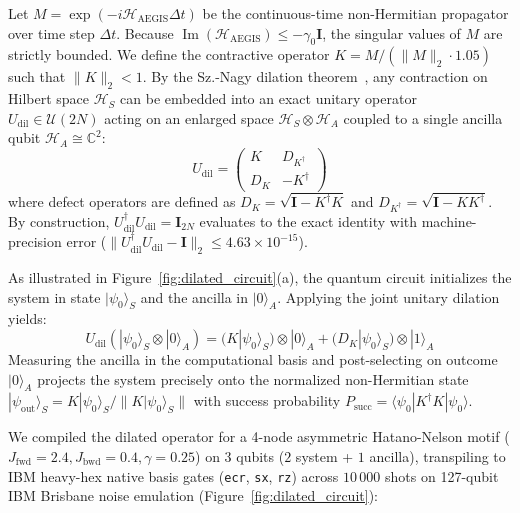 \documentclass[10pt,twocolumn,letterpaper]{article}
\begin{document}
Let $M = \exp(-i \mathcal{H}_{\text{AEGIS}} \Delta t)$ be the continuous-time non-Hermitian propagator over time step $\Delta t$. Because $\operatorname{Im}(\mathcal{H}_{\text{AEGIS}}) \le -\gamma_0 \mathbf{I}$, the singular values of $M$ are strictly bounded. We define the contractive operator $K = M / (\|M\|_2 \cdot 1.05)$ such that $\|K\|_2 < 1$. By the Sz.-Nagy dilation theorem~\cite{kawabata2019symmetry, ashida2020nonhermitian}, any contraction on Hilbert space $\mathcal{H}_S$ can be embedded into an exact unitary operator $U_{\text{dil}} \in \mathcal{U}(2N)$ acting on an enlarged space $\mathcal{H}_S \otimes \mathcal{H}_A$ coupled to a single ancilla qubit $\mathcal{H}_A \cong \mathbb{C}^2$:
\begin{equation}
U_{\text{dil}} = \begin{pmatrix} K & D_{K^\dagger} \\ D_K & -K^\dagger \end{pmatrix}
\end{equation}
where defect operators are defined as $D_K = \sqrt{\mathbf{I} - K^\dagger K}$ and $D_{K^\dagger} = \sqrt{\mathbf{I} - K K^\dagger}$. By construction, $U_{\text{dil}}^\dagger U_{\text{dil}} = \mathbf{I}_{2N}$ evaluates to the exact identity with machine-precision error ($\|U_{\text{dil}}^\dagger U_{\text{dil}} - \mathbf{I}\|_2 \le 4.63 \times 10^{-15}$).

As illustrated in Figure~\ref{fig:dilated_circuit}(a), the quantum circuit initializes the system in state $|\psi_0\rangle_S$ and the ancilla in $|0\rangle_A$. Applying the joint unitary dilation yields:
\begin{equation}
U_{\text{dil}} (|\psi_0\rangle_S \otimes |0\rangle_A) = (K |\psi_0\rangle_S) \otimes |0\rangle_A + (D_K |\psi_0\rangle_S) \otimes |1\rangle_A
\end{equation}
Measuring the ancilla in the computational basis and post-selecting on outcome $|0\rangle_A$ projects the system precisely onto the normalized non-Hermitian state $|\psi_{\text{out}}\rangle_S = K |\psi_0\rangle_S / \|K |\psi_0\rangle_S\|$ with success probability $P_{\text{succ}} = \langle \psi_0 | K^\dagger K | \psi_0 \rangle$.

We compiled the dilated operator for a 4-node asymmetric Hatano-Nelson motif ($J_{\text{fwd}} = 2.4, J_{\text{bwd}} = 0.4, \gamma = 0.25$) on $3$ qubits ($2$ system + $1$ ancilla), transpiling to IBM heavy-hex native basis gates (\texttt{ecr}, \texttt{sx}, \texttt{rz}) across $10\,000$ shots on 127-qubit IBM Brisbane noise emulation (Figure~\ref{fig:dilated_circuit}):
\end{document}
